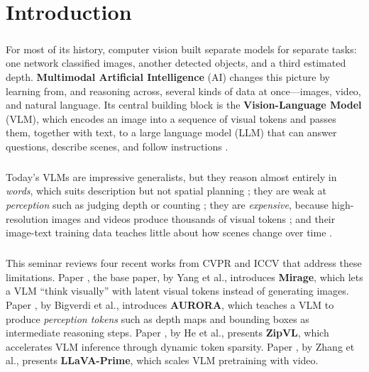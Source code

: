 \documentclass[12pt,a4paper,final]{extreport}
\begin{document}
\setcounter{page}{1}


\chapter{Introduction}

\paragraph{} For most of its history, computer vision built separate models for separate tasks: one network classified images, another detected objects, and a third estimated depth. \textbf{Multimodal Artificial Intelligence} (AI) changes this picture by learning from, and reasoning across, several kinds of data at once---images, video, and natural language. Its central building block is the \textbf{Vision-Language Model} (VLM), which encodes an image into a sequence of visual tokens and passes them, together with text, to a large language model (LLM) that can answer questions, describe scenes, and follow instructions \cite{liu2023,radford2021}.

\paragraph{} Today's VLMs are impressive generalists, but they reason almost entirely in \emph{words}, which suits description but not spatial planning \cite{p1}; they are weak at \emph{perception} such as judging depth or counting \cite{p2}; they are \emph{expensive}, because high-resolution images and videos produce thousands of visual tokens \cite{p3}; and their image-text training data teaches little about how scenes change over time \cite{p4}.

\paragraph{} This seminar reviews four recent works from CVPR and ICCV that address these limitations. Paper \cite{p1}, the base paper, by Yang et al., introduces \textbf{Mirage}, which lets a VLM ``think visually'' with latent visual tokens instead of generating images. Paper \cite{p2}, by Bigverdi et al., introduces \textbf{AURORA}, which teaches a VLM to produce \emph{perception tokens} such as depth maps and bounding boxes as intermediate reasoning steps. Paper \cite{p3}, by He et al., presents \textbf{ZipVL}, which accelerates VLM inference through dynamic token sparsity. Paper \cite{p4}, by Zhang et al., presents \textbf{LLaVA-Prime}, which scales VLM pretraining with video.
\end{document}
